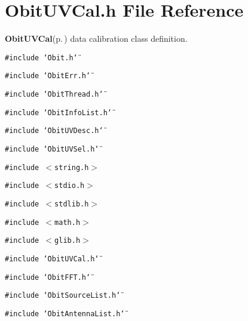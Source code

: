 \section{Obit\-UVCal.h File Reference}
\label{ObitUVCal_8h}
{\bf Obit\-UVCal}{\rm (p.\,\pageref{structObitUVCal})} data calibration class definition. 

{\tt \#include \char`\"{}Obit.h\char`\"{}}\par
{\tt \#include \char`\"{}Obit\-Err.h\char`\"{}}\par
{\tt \#include \char`\"{}Obit\-Thread.h\char`\"{}}\par
{\tt \#include \char`\"{}Obit\-Info\-List.h\char`\"{}}\par
{\tt \#include \char`\"{}Obit\-UVDesc.h\char`\"{}}\par
{\tt \#include \char`\"{}Obit\-UVSel.h\char`\"{}}\par
{\tt \#include $<$string.h$>$}\par
{\tt \#include $<$stdio.h$>$}\par
{\tt \#include $<$stdlib.h$>$}\par
{\tt \#include $<$math.h$>$}\par
{\tt \#include $<$glib.h$>$}\par
{\tt \#include \char`\"{}Obit\-UVCal.h\char`\"{}}\par
{\tt \#include \char`\"{}Obit\-FFT.h\char`\"{}}\par
{\tt \#include \char`\"{}Obit\-Source\-List.h\char`\"{}}\par
{\tt \#include \char`\"{}Obit\-Antenna\-List.h\char`\"{}}\par
